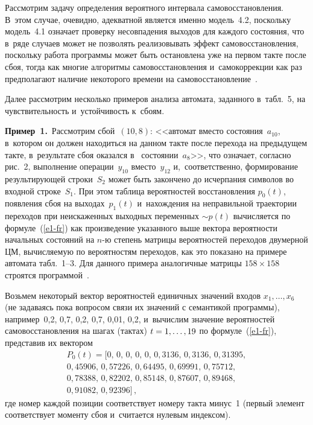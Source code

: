 \begin{multicols}{2}
     Рассмотрим задачу определения вероятного интервала 
самовосстановления. В~этом случае, очевидно, адекватной является именно 
модель~4.2, посколь\-ку модель~4.1 означает проверку несовпадения выходов 
для каждого состояния, что в~ряде случаев может не позволять реализовывать 
эффект самовосстановления, поскольку работа программы может быть 
остановлена уже на первом такте после сбоя, тогда как многие алгоритмы 
самовосстановления и~самокоррекции как раз предполагают наличие 
некоторого времени на самовосстановление~\cite{9-fr}.
     
     Далее рассмотрим несколько примеров анализа автомата, заданного 
в~табл.~5, на чувствительность и~устойчивость к~сбоям.
     
     \smallskip
     
     \noindent
     \textbf{Пример~1.}\  Рассмотрим сбой~$(10,8)$: <<автомат вместо 
состояния~$a_{10}$, в~котором он должен находиться на данном такте после 
перехода на предыдущем такте, в~результате сбоя оказался в~
состоянии~$a_8$>>, что означает, согласно рис.~2, выполнение 
операции~$y_{10}$ вместо~$y_{12}$ и,~соответственно, формирование 
результирующей строки~$S_2$ может быть закончено до исчерпания символов 
во входной строке~$S_1$. При этом таблица вероятностей восстановления 
$p_0(t)$, появления сбоя на выходах~$p_1(t)$ и~нахождения на неправильной 
траектории переходов при неискаженных выходных переменных $\sim p(t)$ 
вычисляется по формуле~(\ref{e1-fr}) как произведение указанного выше 
вектора вероятности начальных состояний на $n$-ю степень матрицы 
вероятностей переходов двумерной ЦМ, вычисляемую по 
вероятностям переходов, как это показано на примере автомата табл.~\mbox{1--3}. Для 
данного примера аналогичные мат\-ри\-цы $158\times158$ строятся 
программой~\cite{10-fr}.
     
    Возьмем некоторый вектор вероятностей единичных значений входов 
$x_1,\ldots, x_6$ (не задаваясь пока вопросом связи их значений с семантикой 
программы), например~0,2, 0,7, 0,2, 0,7, 0,01, 0,2, и~вычислим значение 
вероятностей самовос\-ста\-нов\-ле\-ния на шагах (тактах) $t\hm=1, \ldots, 19$ по 
формуле~(\ref{e1-fr}), представив их вектором
\begin{multline*}
P_0(t) = [0,\, 0,\, 0,\, 0,\, 0,\, 0{,}3136,\, 0{,}3136,\, 0{,}31395,\\ 
0{,}45906,\, 
0{,}57226,\, 0{,}64495,\, 0{,}69991, 
\,0{,}75712,\\ 
0{,}78388,\, 
0{,}82202, \,0{,}85148,\, 0{,}87607,\, 0{,}89468,\\
 0{,}91082,\, 0{,}92396]\,,
\end{multline*}
где номер каждой позиции соответствует номеру такта минус~1 (первый 
элемент соответствует моменту сбоя и~считается нулевым индексом). 
     

\end{multicols}

